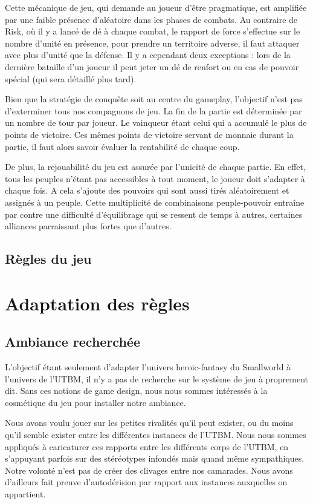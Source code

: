 \documentclass[11pt]{report}
\begin{document}
		Cette mécanique de jeu, qui demande au joueur d'être pragmatique, est amplifiée par une faible présence d'aléatoire dans les phases de combats. Au contraire de Risk\up{\copyright}, où il y a lancé de dé à chaque combat, le rapport de force s'effectue sur le nombre d'unité en présence, pour prendre un territoire adverse, il faut attaquer avec plus d'unité que la défense. Il y a cependant deux exceptions : lors de la dernière bataille d'un joueur il peut jeter un dé de renfort ou en cas de pouvoir spécial (qui sera détaillé plus tard).
		
		Bien que la stratégie de conquête soit au centre du gameplay, l'objectif n'est pas d'exterminer tous nos compagnons de jeu. La fin de la partie est déterminée par un nombre de tour par joueur. Le vainqueur étant celui qui a accumulé le plus de points de victoire. Ces mêmes points de victoire servant de monnaie durant la partie, il faut alors savoir évaluer la rentabilité de chaque coup. 
		
		De plus, la rejouabilité du jeu est assurée par l'unicité de chaque partie. En effet, tous les peuples n'étant pas accessibles à tout moment, le joueur doit s'adapter à chaque fois. A cela s'ajoute des pouvoirs qui sont aussi tirés aléatoirement et assignés à un peuple. Cette multiplicité de combinaisons peuple-pouvoir entraîne par contre une difficulté d'équilibrage qui se ressent de temps à autres, certaines alliances parraissant plus fortes que d'autres.
	\section{Règles du jeu}

\chapter{Adaptation des règles}

	\section{Ambiance recherchée}
	
	L'objectif étant seulement d'adapter l'univers heroic-fantasy du Smallworld\up{\copyright} à l'univers de l'UTBM, il n'y a pas de recherche sur le système de jeu à proprement dit. Sans ces notions de game design, nous nous sommes intéressés à la cosmétique du jeu pour installer notre ambiance. 
	
	Nous avons voulu jouer sur les petites rivalités qu'il peut exister, ou du moins qu'il semble exister entre les différentes instances de l'UTBM. Nous nous sommes appliqués à caricaturer ces rapports entre les différents corps de l'UTBM, en s'appuyant parfois sur des stéréotypes infondés mais quand même sympathiques. Notre volonté n'est pas de créer des clivages entre nos camarades. Nous avons d'ailleurs fait preuve d'autodérision par rapport aux instances auxquelles on appartient. 
	
\end{document}
